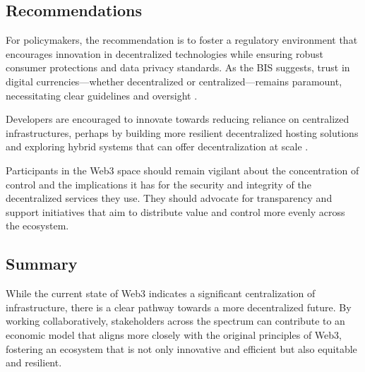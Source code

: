 \documentclass{article}
\begin{document}
\subsection{Recommendations}

For policymakers, the recommendation is to foster a regulatory environment that encourages innovation in decentralized technologies while ensuring robust consumer protections and data privacy standards. As the BIS suggests, trust in digital currencies—whether decentralized or centralized—remains paramount, necessitating clear guidelines and oversight \cite{bismonetary}.

Developers are encouraged to innovate towards reducing reliance on centralized infrastructures, perhaps by building more resilient decentralized hosting solutions and exploring hybrid systems that can offer decentralization at scale \cite{zheng2018blockchain}.

Participants in the Web3 space should remain vigilant about the concentration of control and the implications it has for the security and integrity of the decentralized services they use. They should advocate for transparency and support initiatives that aim to distribute value and control more evenly across the ecosystem.

\subsection{Summary}

While the current state of Web3 indicates a significant centralization of infrastructure, there is a clear pathway towards a more decentralized future. By working collaboratively, stakeholders across the spectrum can contribute to an economic model that aligns more closely with the original principles of Web3, fostering an ecosystem that is not only innovative and efficient but also equitable and resilient.



\end{document}
